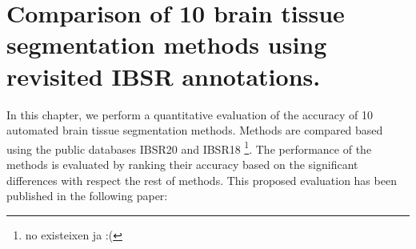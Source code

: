
\chapter{Comparison of 10 brain tissue segmentation methods using revisited IBSR annotations.}  
\label{chapter:chapter_2}
In this chapter, we perform a quantitative evaluation of the accuracy of 10 automated brain tissue segmentation methods. Methods are compared based using the public databases IBSR20 and IBSR18 \footnote{no existeixen ja :(}. The performance of the methods is evaluated by ranking their accuracy based on the significant differences with respect the rest of methods. This proposed evaluation has been published in the following paper:

\vspace{2cm}

\noindent{}





